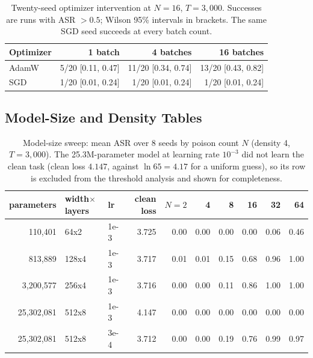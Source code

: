 \documentclass{article} %
\begin{document}
\begin{table}[ht]
\caption{Twenty-seed optimizer intervention at $N=16$, $T=3{,}000$. Successes are runs with ASR $>0.5$; Wilson 95\% intervals in brackets. The same SGD seed succeeds at every batch count.}
\label{tab:events20}
\centering
\small
\begin{tabular}{lrrr}
\toprule
Optimizer & 1 batch & 4 batches & 16 batches \\
\midrule
AdamW & 5/20 [0.11, 0.47] & 11/20 [0.34, 0.74] & 13/20 [0.43, 0.82] \\
SGD & 1/20 [0.01, 0.24] & 1/20 [0.01, 0.24] & 1/20 [0.01, 0.24] \\
\bottomrule
\end{tabular}
\end{table}

\subsection{Model-Size and Density Tables}
\label{app:thresholds}

\begin{table}[ht]
\caption{Model-size sweep: mean ASR over 8 seeds by poison count $N$ (density 4, $T=3{,}000$). The 25.3M-parameter model at learning rate $10^{-3}$ did not learn the clean task (clean loss $4.147$, against $\ln 65=4.17$ for a uniform guess), so its row is excluded from the threshold analysis and shown for completeness.}
\label{tab:modelsize}
\centering
\small
\begin{tabular}{rllrrrrrrr}
\toprule
parameters & width$\times$layers & lr & clean loss & $N{=}2$ & 4 & 8 & 16 & 32 & 64 \\
\midrule
110,401 & 64x2 & 1e-3 & 3.725 & 0.00 & 0.00 & 0.00 & 0.00 & 0.06 & 0.46 \\
813,889 & 128x4 & 1e-3 & 3.717 & 0.01 & 0.01 & 0.15 & 0.68 & 0.96 & 1.00 \\
3,200,577 & 256x4 & 1e-3 & 3.716 & 0.00 & 0.00 & 0.11 & 0.86 & 1.00 & 1.00 \\
25,302,081 & 512x8 & 1e-3 & 4.147 & 0.00 & 0.00 & 0.00 & 0.00 & 0.00 & 0.00 \\
25,302,081 & 512x8 & 3e-4 & 3.712 & 0.00 & 0.00 & 0.19 & 0.76 & 0.99 & 0.97 \\
\bottomrule
\end{tabular}
\end{table}
\end{document}
